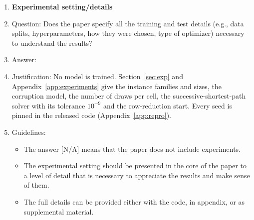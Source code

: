 \begin{enumerate}
\item {\bf Experimental setting/details}
    \item[] Question: Does the paper specify all the training and test details (e.g., data splits, hyperparameters, how they were chosen, type of optimizer) necessary to understand the results?
    \item[] Answer: \answerYes{}
    \item[] Justification: No model is trained. Section~\ref{sec:exp} and Appendix~\ref{app:experiments} give the instance families and sizes, the corruption model, the number of draws per cell, the successive-shortest-path solver with its tolerance $10^{-9}$ and the row-reduction start. Every seed is pinned in the released code (Appendix~\ref{app:repro}).
    \item[] Guidelines:
    \begin{itemize}
        \item The answer [N/A] means that the paper does not include experiments.
        \item The experimental setting should be presented in the core of the paper to a level of detail that is necessary to appreciate the results and make sense of them.
        \item The full details can be provided either with the code, in appendix, or as supplemental material.
    \end{itemize}


\end{enumerate}

